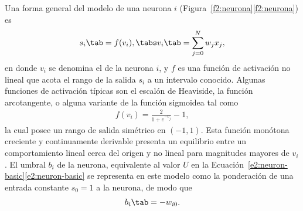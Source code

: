 Una forma general del modelo de una neurona $i$
(\iflatexml{}Figura~\ref{f2:neurona}\else\autoref{f2:neurona}\fi)
es
%
\begin{align}\label{e2:neuron-general}
  s_i \tab = f(v_i), \tabs v_i \tab = \sum_{j=0}^N w_j x_j,
\end{align}
%
en donde $v_i$ se denomina el  de la neurona
$i$, y $f$ es una función de activación no lineal que acota el rango
de la salida $s_i$ a un intervalo conocido. Algunas funciones de
activación típicas son el escalón de Heaviside, la función
arcotangente, o alguna variante de la función sigmoidea
tal como
%
\begin{align}\label{e2:sigmoid-symmetric}
  f(v_i) = \frac{2}{1+e^{-v_j}}-1,
\end{align}
%
la cual posee un rango de salida simétrico en $(-1,1)$.  Esta función
monótona creciente y continuamente derivable presenta un equilibrio
entre un comportamiento lineal cerca del origen y no lineal para
magnitudes mayores de $v_i$.  El umbral $b_i$ de la neurona,
equivalente al valor $U$ en la
\iflatexml{}Ecuación~\ref{e2:neuron-basic}\else\autoref{e2:neuron-basic}\fi
se representa en este modelo como la ponderación de una entrada
constante $s_0=1$ a la neurona, de modo que
%
\begin{align}
  b_i\tab=-w_{i0}.
\end{align}
%

